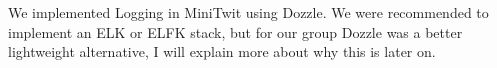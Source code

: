 We implemented Logging in MiniTwit using Dozzle. We were recommended to implement an ELK or ELFK stack, but for our group Dozzle was a better lightweight alternative, I will explain more about why this is later on.

